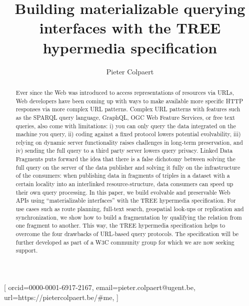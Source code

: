 \documentclass[
]{ceurart}
\begin{document}


\title{Building materializable querying interfaces with the TREE hypermedia specification}

\author{Pieter Colpaert}[%
orcid=0000-0001-6917-2167,
email=pieter.colpaert@ugent.be,
url=https://pietercolpaert.be/#me,
]
\address{IDLab, Department of Electronics and Information Systems, Ghent University -- imec\\
Technologiepark-Zwijnaarde 122, 9052 Ghent, Belgium}


\begin{abstract}
Ever since the Web was introduced to access representations of resources via URLs, Web developers have been coming up with ways to make available more specific HTTP responses via more complex URL patterns.
Complex URL patterns with features such as the SPARQL query language, GraphQL, OGC Web Feature Services, or free text queries, also come with limitations:
i) you can only query the data integrated on the machine you query,
ii) coding against a fixed protocol lowers potential evolvability,
iii) relying on dynamic server functionality raises challenges in long-term preservation, and
iv) sending the full query to a third party server lowers query privacy.
Linked Data Fragments puts forward the idea that there is a false dichotomy between solving the full query on the server of the data publisher and solving it fully on the infrastructure of the consumers:
when publishing data in fragments of triples in a dataset with a certain locality into an interlinked resource-structure, data consumers can speed up their own query processing.
In this paper, we build evolvable and preservable Web APIs using “materializable interfaces” with the TREE hypermedia specification.
For use cases such as route planning, full-text search, geospatial look-ups or replication and synchronization, we show how to build a fragmentation by qualifying the relation from one fragment to another.
This way, the TREE hypermedia specification helps to overcome the four drawbacks of URL-based query protocols.
The specification will be further developed as part of a W3C community group for which we are now seeking support.
\end{abstract}
\end{document}
